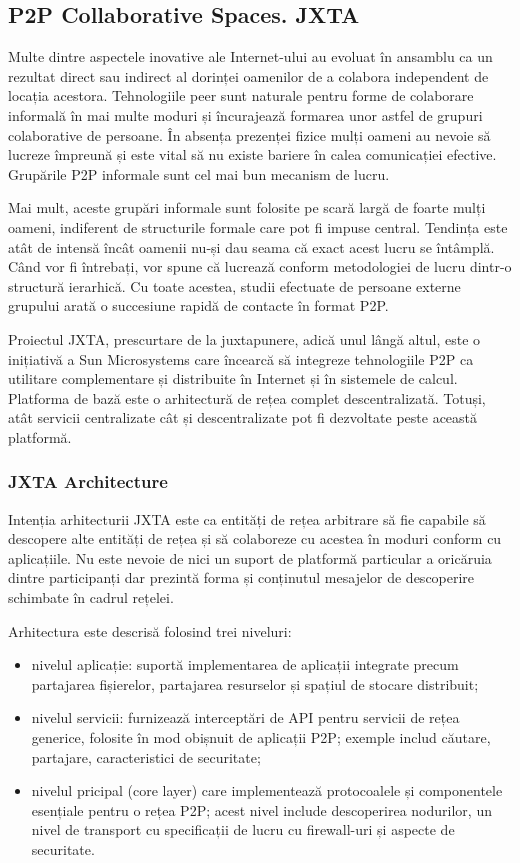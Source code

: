 \subsection{P2P Collaborative Spaces. JXTA}

Multe dintre aspectele inovative ale Internet-ului au evoluat în ansamblu ca
un rezultat direct sau indirect al dorinței oamenilor de a colabora
independent de locația acestora. Tehnologiile peer sunt naturale pentru forme
de colaborare informală în mai multe moduri și încurajează formarea unor
astfel de grupuri colaborative de persoane. În absența prezenței fizice mulți
oameni au nevoie să lucreze împreună și este vital să nu existe bariere în
calea comunicației efective. Grupările P2P informale sunt cel mai bun mecanism
de lucru.

Mai mult, aceste grupări informale sunt folosite pe scară largă de foarte
mulți oameni, indiferent de structurile formale care pot fi impuse central.
Tendința este atât de intensă încât oamenii nu-și dau seama că exact acest
lucru se întâmplă. Când vor fi întrebați, vor spune că lucrează conform
metodologiei de lucru dintr-o structură ierarhică. Cu toate acestea, studii
efectuate de persoane externe grupului arată o succesiune rapidă de contacte
în format P2P.

Proiectul JXTA, prescurtare de la juxtapunere, adică unul lângă altul, este o
inițiativă a Sun Microsystems care încearcă să integreze tehnologiile P2P ca
utilitare complementare și distribuite în Internet și în sistemele de calcul.
Platforma de bază este o arhitectură de rețea complet descentralizată. Totuși,
atât servicii centralizate cât și descentralizate pot fi dezvoltate peste
această platformă.

\subsubsection{JXTA Architecture}

Intenția arhitecturii JXTA este ca entități de rețea arbitrare să fie capabile
să descopere alte entități de rețea și să colaboreze cu acestea în moduri
conform cu aplicațiile. Nu este nevoie de nici un suport de platformă
particular a oricăruia dintre participanți dar prezintă forma și conținutul
mesajelor de descoperire schimbate în cadrul rețelei.

Arhitectura este descrisă folosind trei niveluri:

\begin{itemize}
  \item nivelul aplicație: suportă implementarea de aplicații integrate precum
  partajarea fișierelor, partajarea resurselor și spațiul de stocare
  distribuit;
  \item nivelul servicii: furnizează interceptări de API pentru servicii de
  rețea generice, folosite în mod obișnuit de aplicații P2P; exemple includ
  căutare, partajare, caracteristici de securitate;
  \item nivelul pricipal (core layer) care implementează protocoalele și
  componentele esențiale pentru o rețea P2P; acest nivel include descoperirea
  nodurilor, un nivel de transport cu specificații de lucru cu firewall-uri și
  aspecte de securitate.
\end{itemize}


